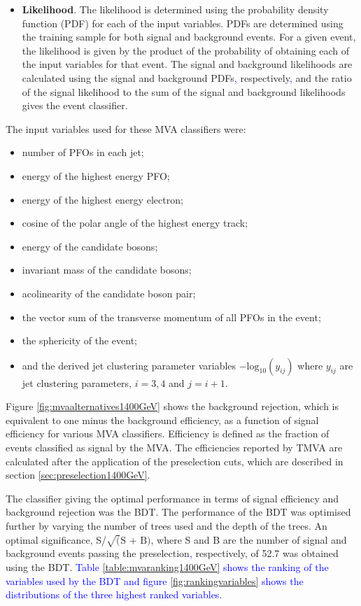 \begin{itemize}
\item \textbf{Likelihood}.  The likelihood is determined using the probability density function (PDF) for each of the input variables.  PDFs are determined using the training sample for both signal and background events.  For a given event, the likelihood is given by the product of the probability of obtaining each of the input variables for that event.  The signal and background likelihoods are calculated using the signal and background PDFs\textcolor{blue}{,} respectively\textcolor{blue}{,} and the ratio of the signal likelihood to the sum of the signal and background likelihoods gives the event classifier.   
\end{itemize}

The input variables used for these MVA classifiers were:
\begin{itemize}
\item number of PFOs in each jet;
\item energy of the highest energy PFO;
\item energy of the highest energy electron;
\item cosine of the polar angle of the highest energy track;
\item energy of the candidate bosons;
\item invariant mass of the candidate bosons;
\item acolinearity of the candidate boson pair;
\item the vector sum of the transverse momentum of all PFOs in the event;
\item the sphericity of the event;
\item and the derived jet clustering parameter variables $-\text{log}_{10}(y_{ij})$ where $y_{ij}$ are jet clustering parameters, $i = 3,4$ and $j=i+1$.  
\end{itemize}

Figure \ref{fig:mvaalternatives1400GeV} shows the background rejection, which is equivalent to one minus the background efficiency, as a function of signal efficiency for various MVA classifiers.  Efficiency is defined as the fraction of events classified as signal by the MVA.  The efficiencies reported by TMVA are calculated after the application of the preselection cuts, which are described in section \ref{sec:preselection1400GeV}.  

The classifier giving the optimal performance in terms of signal efficiency and background rejection was the BDT.  The performance of the BDT was optimised further by varying the number of trees used and the depth of the trees.  An optimal significance, S/$\sqrt(\text{S + B})$, where S and B are the number of signal and background events passing the preselection\textcolor{blue}{,} respectively, of 52.7 was obtained using the BDT.  \textcolor{blue}{Table \ref{table:mvaranking1400GeV} shows the ranking of the variables used by the BDT and figure \ref{fig:rankingvariables} shows the distributions of the three highest ranked variables.}

